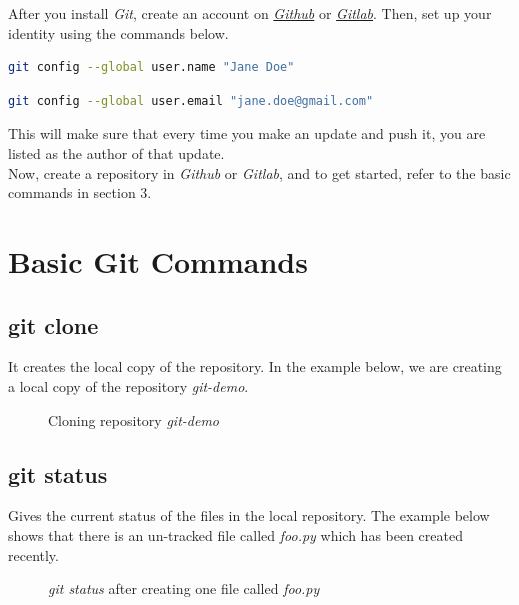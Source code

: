 \documentclass[letterpaper]{article}
\begin{document}
After you install \textit{Git}, create an account on \href{https://github.com/}{\textit{Github}} or \href{https://about.gitlab.com/}{\textit{Gitlab}}.
Then, set up your identity using the commands below.

\begin{lstlisting}[language=Bash]
git config --global user.name "Jane Doe"
\end{lstlisting}

\begin{lstlisting}[language=Bash]
git config --global user.email "jane.doe@gmail.com"
\end{lstlisting}

This will make sure that every time you make an update and push it, you are listed as the author of that update.\\

Now, create a repository in \textit{Github} or \textit{Gitlab}, and to get started, refer to the basic commands in section 3.

\section{Basic Git Commands}
\subsection{git clone}
It creates the local copy of the repository. In the example below, we are creating a local copy of the repository \textit{git-demo}.

 \begin{figure}[h]
    \centering
    \caption{Cloning repository \textit{git-demo}}
  \end{figure}

\subsection{git status}
Gives the current status of the files in the local repository. The example below shows that there is an un-tracked file called \textit{foo.py} which has been created recently.

\begin{figure}[h]
    \centering
    \caption{\textit{git status} after creating one file called \textit{foo.py}}
  \end{figure}
\end{document}
